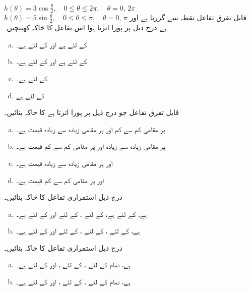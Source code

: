 $h(\theta)=3\cos\tfrac{\theta}{2},\quad 0\le \theta\le 2\pi, \quad \theta=0, \,2\pi$
$h(\theta)=5\sin\tfrac{\theta}{2},\quad 0\le \theta\le \pi,\quad \theta=0,\, \pi$
قابل تفرق تفاعل  نقطہ  سے گزرتا ہے اور  ہے۔درج ذیل پر پورا اترتا ہوا اس تفاعل کا خاکہ کھینچیں۔
\begin{enumerate}[a.]
\item
{} کے لئے  ہے اور  کے لئے  ہے۔
\item
{} کے لئے  ہے اور  کے لئے  ہے۔
\item
{} کے لئے  ہے۔
\item
{} کے لئے  ہے
\end{enumerate}
قابل تفرق تفاعل  جو درج ذیل پر پورا اترتا ہے کا خاکہ بنائیں۔
\begin{enumerate}[a.]
\item
{} پر مقامی کم سے کم اور  پر مقامی زیادہ سے زیادہ قیمت  ہے۔
\item
{} پر مقامی زیادہ سے زیادہ اور  پر مقامی کم سے کم قیمت ہے۔
\item
{} اور  پر مقامی زیادہ سے زیادہ قیمت ہے۔
\item
{} اور  پر مقامی کم سے کم قیمت ہے۔
\end{enumerate} 
درج ذیل استمراری تفاعل  کا خاکہ بنائیں۔
\begin{enumerate}[a.]
\item
{} ہے،  کے لئے  ہے،  کے لئے ،  کے لئے  اور  کے لئے  ہے۔
\item
{} ہے،  کے لئے ،  کے لئے ،  کے لئے  اور  کے لئے  ہے۔
\end{enumerate}
درج ذیل استمراری تفاعل  کا خاکہ بنائیں۔
\begin{enumerate}[a.]
\item
{} ہے، تمام  کے لئے ،  کے لئے ، اور  کے لئے  ہے۔
\item
{} ہے، تمام  کے لئے ،  کے لئے ، اور  کے لئے  ہے۔ 
\end{enumerate}
